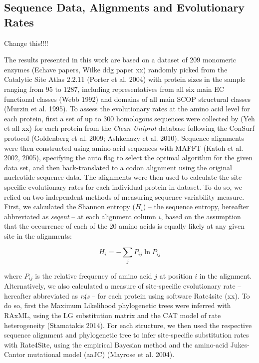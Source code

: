\documentclass[12pt]{article}
\begin{document}
    \subsection*{Sequence Data, Alignments and Evolutionary Rates} {\color{red} Change this!!!!}

    The results presented in this work are based on a dataset of $209$ monomeric enzymes {\color{red}(Echave papers, Wilke ddg paper xx)} randomly picked from the Catalytic Site Atlas $2.2.11$ (Porter et al. 2004) with protein sizes in the sample ranging from $95$ to $1287$, including representatives from all six main EC functional classes {\color{red}(Webb 1992)} and domains of all main SCOP structural classes (Murzin et al. 1995). To assess the evolutionary rates at the amino acid level for each protein, first a set of up to $300$ homologous sequences were collected by {\color{red}(Yeh et all xx)} for each protein from the {\it Clean Uniprot} database following the ConSurf protocol {\color{red}(Goldenberg et al. 2009; Ashkenazy et al. 2010)}. Sequence alignments were then constructed using amino-acid sequences with MAFFT {\color{red}(Katoh et al. 2002, 2005)}, specifying the auto flag to select the optimal algorithm for the given data set, and then back-translated to a codon alignment using the original nucleotide sequence data. The alignments were then used to calculate the site-specific evolutionary rates for each individual protein in dataset. To do so, we relied on two independent methods of measuring sequence variability measure. First, we calculated the Shannon entropy ($H_i$) -- the sequence entropy, hereafter abbreviated as {\it seqent} -- at each alignment column $i$, based on the assumption that the occurrence of each of the $20$ amino acids is equally likely at any given site in the alignments:

    \begin{equation}
        \label{eqn:shannon}
        H_i = -\sum_j P_{ij}\ln P_{ij}
    \end{equation}

    where $P_{ij}$ is the relative frequency of amino acid $j$ at position $i$ in the alignment. Alternatively, we also calculated a measure of site-specific evolutionary rate -- hereafter abbreviated as {\it r4s} -- for each protein using software Rate4site {\color{red}(xx)}. To do so, first the Maximum Likelihood phylogenetic trees were inferred with RAxML, using the LG substitution matrix and the CAT model of rate heterogeneity {\color{red}(Stamatakis 2014)}. For each structure, we then used the respective sequence alignment and phylogenetic tree to infer site-specific substitution rates with Rate4Site, using the empirical Bayesian method and the amino-acid Jukes-Cantor mutational model (aaJC) {\color{red}(Mayrose et al. 2004)}.
\end{document}
